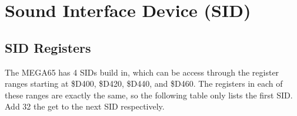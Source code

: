 \chapter{Sound Interface Device (SID)}

\section{SID Registers}

The MEGA65 has 4 SIDs build in, which can be access through the register ranges
starting at \$D400, \$D420, \$D440, and \$D460. The registers in each of these ranges are
exactly the same, so the following table only lists the first SID. Add 32 the get to
the next SID respectively.


